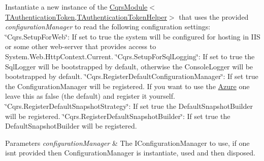 Instantiate a new instance of the \hyperlink{classCqrs_1_1Ninject_1_1Configuration_1_1CqrsModule_a31a1047d3940842b760ad2a796aa1606_a31a1047d3940842b760ad2a796aa1606}{Cqrs\+Module$<$\+T\+Authentication\+Token,\+T\+Authentication\+Token\+Helper$>$} that uses the provided {\itshape configuration\+Manager}  to read the following configuration settings\+: \char`\"{}\+Cqrs.\+Setup\+For\+Web\char`\"{}\+: If set to true the system will be configured for hosting in I\+IS or some other web-\/server that provides access to System.\+Web.\+Http\+Context.\+Current. \char`\"{}\+Cqrs.\+Setup\+For\+Sql\+Logging\char`\"{}\+: If set to true the Sql\+Logger will be bootstrapped by default, otherwise the Console\+Logger will be bootstrapped by default. \char`\"{}\+Cqrs.\+Register\+Default\+Configuration\+Manager\char`\"{}\+: If set true the Configuration\+Manager will be registered. If you want to use the \hyperlink{namespaceCqrs_1_1Ninject_1_1Azure}{Azure} one leave this as false (the default) and register it yourself. \char`\"{}\+Cqrs.\+Register\+Default\+Snapshot\+Strategy\char`\"{}\+: If set true the Default\+Snapshot\+Builder will be registered. \char`\"{}\+Cqrs.\+Register\+Default\+Snapshot\+Builder\char`\"{}\+: If set true the Default\+Snapshot\+Builder will be registered. 


\begin{DoxyParams}{Parameters}
{\em configuration\+Manager} & The I\+Configuration\+Manager to use, if one isn\textquotesingle{}t provided then Configuration\+Manager is instantiate, used and then disposed.\\
\hline
\end{DoxyParams}
\mbox{\label{classCqrs_1_1Ninject_1_1Configuration_1_1CqrsModule_a6ab750b5adea25eb8e2f0107fdfc9a47_a6ab750b5adea25eb8e2f0107fdfc9a47}} 
